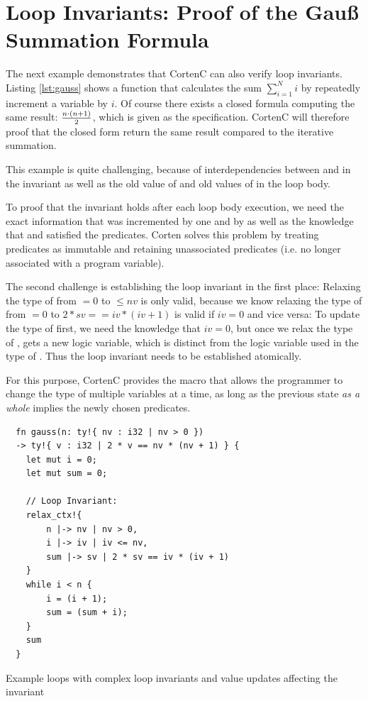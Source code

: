 \documentclass[twoside, english]{sdqthesis}
\theoremstyle{definition}
\begin{document}
\section{Loop Invariants: Proof of the Gauß Summation Formula}\label{sec:evaluation-gauss} 

The next example demonstrates that CortenC can also verify loop invariants. Listing \ref{lst:gauss} shows a function that calculates the sum $\sum_{i = 1}^N i$ by repeatedly increment a variable by $i$. 
Of course there exists a closed formula computing the same result: $n \cdot (n + 1) \over 2$, which is given as the specification. CortenC will therefore proof that the closed form return the same result compared to the iterative summation.

This example is quite challenging, because of interdependencies between  and  in the invariant as well as the old value of  and old values of  in the loop body. 

To proof that the invariant holds after each loop body execution, we need the exact information that  was incremented by one and  by  as well as the knowledge that  and  satisfied the predicates. Corten solves this problem by treating predicates as immutable and retaining unassociated predicates (i.e. no longer associated with a program variable).

The second challenge is establishing the loop invariant in the first place: Relaxing the type of  from $= 0$ to $\leq nv$ is only valid, because we know relaxing the type of  from $= 0$ to $ 2 * sv == iv * (iv + 1)$ is valid if $iv = 0$ and vice versa: To update the type of  first, we need the knowledge that $iv = 0$, but once we relax the type of ,  gets a new logic variable, which is distinct from the logic variable used in the type of . Thus the loop invariant needs to be established atomically.

For this purpose, CortenC provides the  macro that allows the programmer to change the type of multiple variables at a time, as long as the previous state \textit{as a whole} implies the newly chosen predicates.

\begin{listing}[ht]
  \begin{verbatim}
  fn gauss(n: ty!{ nv : i32 | nv > 0 }) 
  -> ty!{ v : i32 | 2 * v == nv * (nv + 1) } {
    let mut i = 0;
    let mut sum = 0;
    
    // Loop Invariant:
    relax_ctx!{
        n |-> nv | nv > 0,
        i |-> iv | iv <= nv,
        sum |-> sv | 2 * sv == iv * (iv + 1)
    }
    while i < n {
        i = (i + 1);
        sum = (sum + i);
    }
    sum
  }
  \end{verbatim}
  \caption{Example loops with complex loop invariants and value updates affecting the invariant}
  \label{lst:gauss}
\end{listing}
\end{document}
